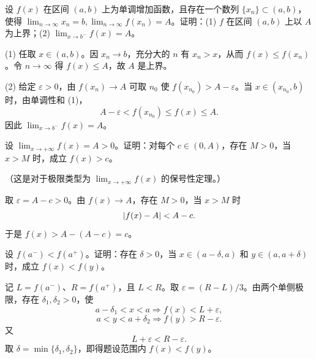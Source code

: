 \begin{xexercise}[8]
设 $f(x)$ 在区间 $(a,b)$ 上为单调增加函数，且存在一个数列 $\{x_n\}\subset(a,b)$，使得 $\lim_{n\to\infty}x_n=b,\lim_{n\to\infty}f(x_n)=A$。证明：(1) $f$ 在区间 $(a,b)$ 上以 $A$ 为上界；(2) $\lim_{x\to b^-}f(x)=A$。
\end{xexercise}
\begin{xsolution}
(1) 任取 $x\in(a,b)$。因 $x_n\to b$，充分大的 $n$ 有 $x_n>x$，从而
$f(x)\leq f(x_n)$。令 $n\to\infty$ 得 $f(x)\leq A$，故 $A$ 是上界。

(2) 给定 $\varepsilon>0$，由 $f(x_n)\to A$ 可取 $n_0$ 使
$f(x_{n_0})>A-\varepsilon$。当 $x\in(x_{n_0},b)$ 时，由单调性和 (1)，
\[
  A-\varepsilon<f(x_{n_0})\leq f(x)\leq A.
\]
因此 $\lim_{x\to b^-}f(x)=A$。
\end{xsolution}


\begin{xexercise}[9]
设 $\lim_{x\to+\infty}f(x)=A>0$。证明：对每个 $c\in(0,A)$，存在 $M>0$，当 $x>M$ 时，成立 $f(x)>c$。

  （这是对于极限类型为 $\lim_{x\to+\infty}f(x)$ 的保号性定理。）
\end{xexercise}
\begin{xsolution}
取 $\varepsilon=A-c>0$。由 $f(x)\to A$，存在 $M>0$，当 $x>M$ 时
\[
  \lvert f(x)-A\rvert<A-c.
\]
于是 $f(x)>A-(A-c)=c$。
\end{xsolution}


\begin{xexercise}[10]
设 $f(a^-)<f(a^+)$。证明：存在 $\delta>0$，当 $x\in(a-\delta,a)$ 和 $y\in(a,a+\delta)$ 时，成立 $f(x)<f(y)$。
\end{xexercise}
\begin{xsolution}
记 $L=f(a^-)$、$R=f(a^+)$，且 $L<R$。取
$\varepsilon=(R-L)/3$。由两个单侧极限，存在 $\delta_1,\delta_2>0$，使
\[
  a-\delta_1<x<a\Rightarrow f(x)<L+\varepsilon,
\]
\[
  a<y<a+\delta_2\Rightarrow f(y)>R-\varepsilon.
\]
又
\[
  L+\varepsilon<R-\varepsilon.
\]
取 $\delta=\min\{\delta_1,\delta_2\}$，即得题设范围内 $f(x)<f(y)$。
\end{xsolution}


